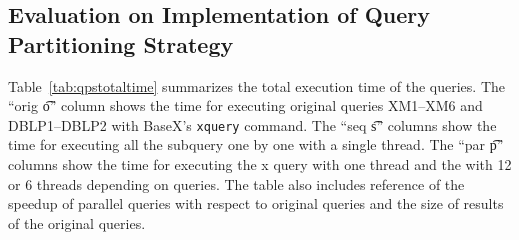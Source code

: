 \subsection{Evaluation on Implementation of Query Partitioning Strategy}
\label{sec:qpseval}

Table~\ref{tab:qpstotaltime} summarizes the total execution time of the queries.
The ``orig \t{o}'' column shows the time for executing original queries XM1--XM6
and DBLP1--DBLP2 with BaseX's \texttt{xquery} command. The ``seq \t{s}'' columns
show the time for executing all the subquery one by one with a single thread.
The ``par \t{p}'' columns show  the time for executing the x query with one
thread and the with 12 or 6 threads depending on queries. The table also
includes reference of the speedup of parallel queries with respect to original
queries and the size of results of the original queries.


